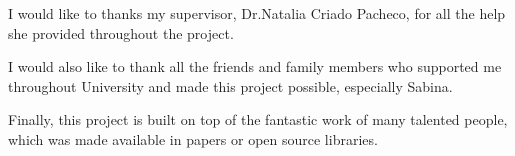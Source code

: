 I would like to thanks my supervisor, Dr.Natalia Criado Pacheco,
for all the help she provided throughout the project.

I would also like to thank all the friends and
family members who supported me throughout
University and made this project possible, especially Sabina.

Finally, this project is built on top of the fantastic work of many
talented people, which was made available in papers or open source libraries. 